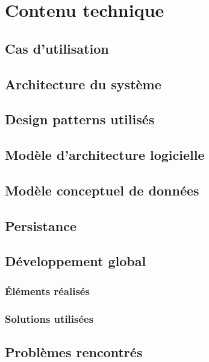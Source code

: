 \section{Contenu technique}
\lipsumC

    \subsection{Cas d'utilisation}
    \lipsumC
    
    \subsection{Architecture du système}
    \lipsumC
    
    \subsection{Design patterns utilisés}
    \lipsumC
    
    \subsection{Modèle d'architecture logicielle}
    \lipsum
    
    \subsection{Modèle conceptuel de données}
    \lipsumC
    
    \subsection{Persistance}
    \lipsumC
    
    \subsection{Développement global}
    \lipsumC
    
        \subsubsection{Éléments réalisés}
        \lipsumC

        \subsubsection{Solutions utilisées}
        \lipsumC
    
    \subsection{Problèmes rencontrés}
    \lipsumC